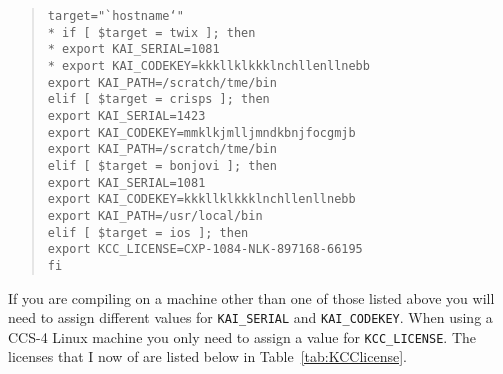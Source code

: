 \documentclass[10pt]{nmemo}
\newcommand{\comp}[1]{\normalfont\normalsize\texttt{#1}}
\begin{document}
\begin{verse}
\texttt{target="`hostname`"\\*
     if [ \$target = twix ]; then\\*
\hspace*{0.25in}         export KAI\_SERIAL=1081\\*
\hspace*{0.25in}         export KAI\_CODEKEY=kkkllklkkklnchllenllnebb\\
\hspace*{0.25in}         export KAI\_PATH=/scratch/tme/bin\\
    elif [ \$target = crisps ]; then\\
\hspace*{0.25in}         export KAI\_SERIAL=1423\\
\hspace*{0.25in}         export KAI\_CODEKEY=mmklkjmlljmndkbnjfocgmjb\\
\hspace*{0.25in}         export KAI\_PATH=/scratch/tme/bin\\
    elif [ \$target = bonjovi ]; then\\
\hspace*{0.25in}         export KAI\_SERIAL=1081\\
\hspace*{0.25in}         export KAI\_CODEKEY=kkkllklkkklnchllenllnebb\\
\hspace*{0.25in}         export KAI\_PATH=/usr/local/bin\\
    elif [ \$target = ios ]; then\\
\hspace*{0.25in}         export KCC\_LICENSE=CXP-1084-NLK-897168-66195\\
    fi
}
\end{verse}

\normalsize

If you are compiling on a machine other than one of those listed above
you will need to assign different values for \comp{KAI\_SERIAL} and
\comp{KAI\_CODEKEY}.  When using a CCS-4 Linux machine you only need
to assign a value for \comp{KCC\_LICENSE}.  The licenses that I now of 
are listed below in Table~\ref{tab:KCClicense}.
\end{document}
